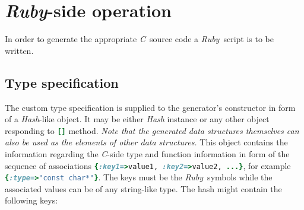 \documentclass[a4paper]{article}
\newcommand{\R}{\emph{Ruby}}
\newcommand{\C}{\emph{C}}
\begin{document}
\section{\R-side operation}


In order to generate the appropriate \C\ source code a \R\ script is to be written.


\subsection{Type specification}


The custom type specification is supplied to the generator's constructor in form of a \emph{Hash}-like object.
It may be either \emph{Hash} instance or any other object responding to \lstinline[language=Ruby]![]! method.
\emph{Note that the generated data structures themselves can also be used as the elements of other data structures.}
This object contains the information regarding the \C-side type and function information in form of the sequence of associations \lstinline[language=Ruby]!{:key1=>value1, :key2=>value2, ...}!, for example \lstinline[language=Ruby]!{:type=>"const char*"}!. The keys must be the \R\ symbols while the associated values can be of any string-like type.
The hash might contain the following keys:
\end{document}
